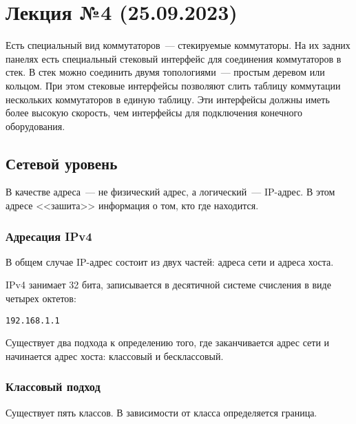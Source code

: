 \section{Лекция №4 (25.09.2023)}

Есть специальный вид коммутаторов~--- стекируемые коммутаторы. На их задних панелях есть специальный стековый интерфейс для соединения коммутаторов в стек. В стек можно соединить двумя топологиями~--- простым деревом или кольцом. При этом стековые интерфейсы позволяют слить таблицу коммутации нескольких коммутаторов в единую таблицу. Эти интерфейсы должны иметь более высокую скорость, чем интерфейсы для подключения конечного оборудования.

\subsection{Сетевой уровень}

В качестве адреса~--- не физический адрес, а логический~--- IP-адрес. В этом адресе <<зашита>> информация о том, кто где находится.

\subsubsection{Адресация IPv4}

В общем случае IP-адрес состоит из двух частей: адреса сети и адреса хоста.

IPv4 занимает 32 бита, записывается в десятичной системе счисления в виде
четырех октетов:
%
\begin{center}
    \texttt{192.168.1.1}
\end{center}
%
Существует два подхода к определению того, где заканчивается адрес сети и начинается адрес хоста: классовый и бесклассовый.

\subsubsection{Классовый подход}

Существует пять классов. В зависимости от класса определяется граница.


